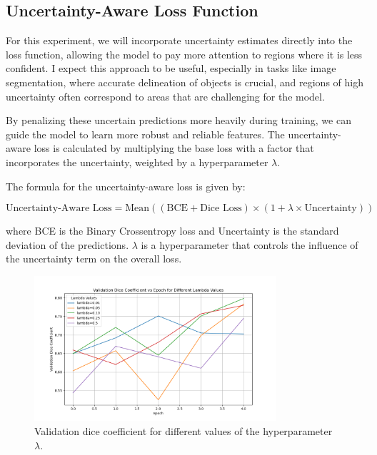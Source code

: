 \documentclass{article}
\begin{document}
\subsection{Uncertainty-Aware Loss Function}

For this experiment, we will incorporate uncertainty estimates directly into the loss function, allowing the model 
to pay more attention to regions where it is less confident. I expect this approach to be useful, especially in tasks like 
image segmentation, where accurate delineation of objects is crucial, and regions of high uncertainty often correspond to 
areas that are challenging for the model.
\vspace{1em}

By penalizing these uncertain predictions more heavily during training, we can guide the model to learn more robust 
and reliable features. The uncertainty-aware loss is calculated by multiplying the base loss with a factor that 
incorporates the uncertainty, weighted by a hyperparameter \(\lambda\).

The formula for the uncertainty-aware loss is given by:

\[
\text{Uncertainty-Aware Loss} = \text{Mean} \left( (\text{BCE} + \text{Dice Loss}) \times (1 + \lambda \times \text{Uncertainty}) \right)
\]

where BCE is the Binary Crossentropy loss and Uncertainty is the standard deviation of the predictions. 
\(\lambda\) is a hyperparameter that controls the influence of the uncertainty term on the overall loss.

\begin{figure}[h]
    \centering
    \includegraphics[width=0.8\textwidth]{../images/uncertainity aware loss funcs/diff_lambvda_values_graph.png}
    \caption{Validation dice coefficient for different values of the hyperparameter \(\lambda\).}
    \label{fig:uncertainty_aware_loss}
\end{figure}
\end{document}
